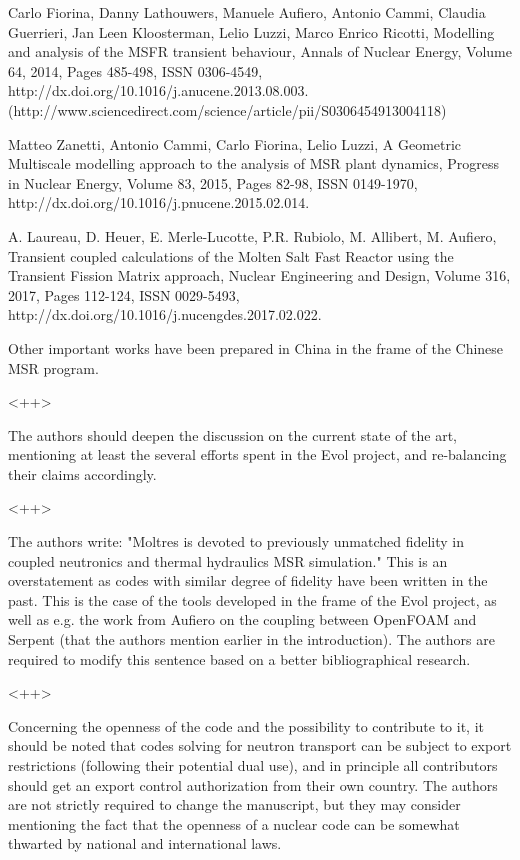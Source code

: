 \documentclass[answers,11pt]{exam}
\begin{document}
\begin{questions}
Carlo Fiorina, Danny Lathouwers, Manuele Aufiero, Antonio Cammi, Claudia Guerrieri, Jan Leen Kloosterman, Lelio Luzzi, Marco Enrico Ricotti, Modelling and analysis of the MSFR transient behaviour, Annals of Nuclear Energy, Volume 64, 2014, Pages 485-498, ISSN 0306-4549, http://dx.doi.org/10.1016/j.anucene.2013.08.003.
(http://www.sciencedirect.com/science/article/pii/S0306454913004118)

Matteo Zanetti, Antonio Cammi, Carlo Fiorina, Lelio Luzzi, A Geometric Multiscale modelling approach to the analysis of MSR plant dynamics, Progress in Nuclear Energy, Volume 83, 2015, Pages 82-98, ISSN 0149-1970, http://dx.doi.org/10.1016/j.pnucene.2015.02.014.

A. Laureau, D. Heuer, E. Merle-Lucotte, P.R. Rubiolo, M. Allibert, M. Aufiero, Transient coupled calculations of the Molten Salt Fast Reactor using the Transient Fission Matrix approach, Nuclear Engineering and Design, Volume 316, 2017, Pages 112-124, ISSN 0029-5493, http://dx.doi.org/10.1016/j.nucengdes.2017.02.022.

Other important works have been prepared in China in the frame of the Chinese MSR program.

\begin{solution}
<++>
\end{solution}

\question 
 The authors should deepen the discussion on the current state of the art, mentioning at least the several efforts spent in the Evol project, and re-balancing their claims accordingly.
\begin{solution}
<++>
\end{solution}

\question 
The authors write:
"Moltres is devoted to previously unmatched fidelity in coupled neutronics and thermal hydraulics MSR simulation."
This is an overstatement as codes with similar degree of fidelity have been written in the past. This is the case of the tools developed in the frame of the Evol project, as well as e.g. the work from Aufiero on the coupling between OpenFOAM and Serpent (that the authors mention earlier in the introduction). The authors are required to modify this sentence based on a better bibliographical research.
\begin{solution}
<++>
\end{solution}

\question 
Concerning the openness of the code and the possibility to contribute to it, it should be noted that codes solving for neutron transport can be subject to export restrictions (following their potential dual use), and in principle all contributors should get an export control authorization from their own country. The authors are not strictly required to change the manuscript, but they may consider mentioning the fact that the openness of a nuclear code can be somewhat thwarted by national and international laws.


\end{questions}
\end{document}
